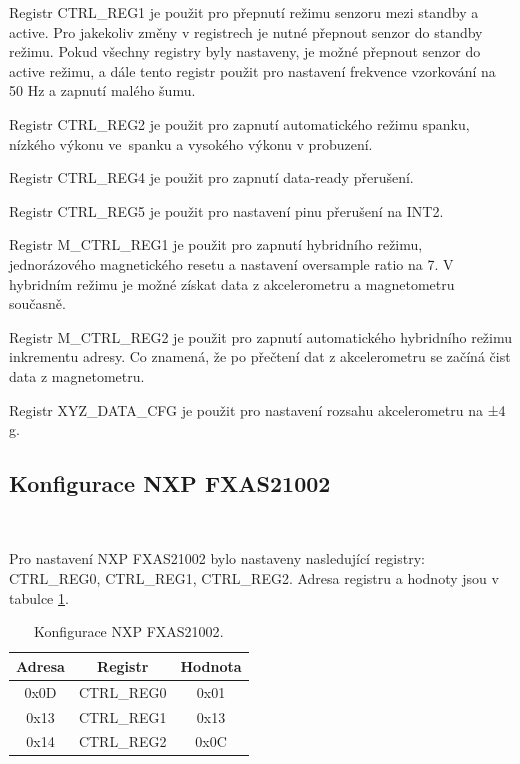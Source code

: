 Registr CTRL\_REG1 je použit pro přepnutí režimu senzoru mezi standby a active.
Pro jakekoliv změny v registrech je nutné přepnout senzor do standby režimu.
Pokud všechny registry byly nastaveny, je možné přepnout senzor do active režimu, a dále
tento registr použit pro nastavení frekvence vzorkování na 50 Hz a zapnutí malého šumu.

Registr CTRL\_REG2 je použit pro zapnutí automatického režimu spanku, nízkého
výkonu ve~spanku a vysokého výkonu v probuzení.

Registr CTRL\_REG4 je použit pro zapnutí data-ready přerušení.

Registr CTRL\_REG5 je použit pro nastavení pinu přerušení na INT2.

Registr M\_CTRL\_REG1 je použit pro zapnutí hybridního režimu,
jednorázového magnetického resetu a nastavení oversample ratio na 7. V hybridním režimu
je možné získat data z akcelerometru a magnetometru současně.

Registr M\_CTRL\_REG2 je použit pro zapnutí automatického hybridního režimu inkrementu adresy.
Co znamená, že po přečtení dat z akcelerometru se začíná čist data z magnetometru.

Registr XYZ\_DATA\_CFG je použit pro nastavení rozsahu akcelerometru na ±4 g\cite{FXOS8700CQ}.

\subsection{Konfigurace NXP FXAS21002}\

Pro nastavení NXP FXAS21002 bylo nastaveny nasledující registry: CTRL\_REG0, CTRL\_REG1, CTRL\_REG2.
Adresa registru a hodnoty jsou v tabulce \ref{tab:FXAS21002}.

\begin{table}[!h]
    \centering
    \begin{tabular}{ccc}
        \hline
        \textbf{Adresa} & \textbf{Registr} & \textbf{Hodnota} \\
        \hline
        0x0D            & CTRL\_REG0       & 0x01             \\
        0x13            & CTRL\_REG1       & 0x13             \\
        0x14            & CTRL\_REG2       & 0x0C             \\
        \hline
    \end{tabular}
    \caption{Konfigurace NXP FXAS21002\cite{FXAS21002}.}
    \label{tab:FXAS21002}
\end{table}

